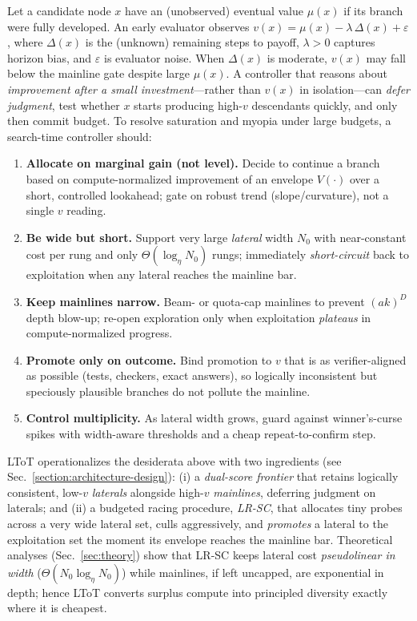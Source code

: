 \documentclass{article}
\begin{document}
Let a candidate node $x$ have an (unobserved) eventual value $\mu(x)$ if its branch were fully developed.
An early evaluator observes $v(x) = \mu(x) - \lambda \,\Delta(x) + \varepsilon$, where $\Delta(x)$ is the (unknown) remaining steps to payoff, $\lambda>0$ captures horizon bias, and $\varepsilon$ is evaluator noise.
When $\Delta(x)$ is moderate, $v(x)$ may fall below the mainline gate despite large $\mu(x)$.
A controller that reasons about \emph{improvement after a small investment}—rather than $v(x)$ in isolation—can \emph{defer judgment}, test whether $x$ starts producing high-$v$ descendants quickly, and only then commit budget.
To resolve saturation and myopia under large budgets, a search-time controller should:
\begin{enumerate}[leftmargin=*, itemsep=2pt, topsep=2pt]
    \item \textbf{Allocate on marginal gain (not level).} Decide to continue a branch based on compute-normalized improvement of an envelope $V(\cdot)$ over a short, controlled lookahead; gate on robust trend (slope/curvature), not a single $v$ reading.
    \item \textbf{Be wide but short.} Support very large \emph{lateral} width $N_0$ with near-constant cost per rung and only $\Theta(\log_{\eta} N_0)$ rungs; immediately \emph{short-circuit} back to exploitation when any lateral reaches the mainline bar.
    \item \textbf{Keep mainlines narrow.} Beam- or quota-cap mainlines to prevent $(ak)^D$ depth blow-up; re-open exploration only when exploitation \emph{plateaus} in compute-normalized progress.
    \item \textbf{Promote only on outcome.} Bind promotion to $v$ that is as verifier-aligned as possible (tests, checkers, exact answers), so logically inconsistent but speciously plausible branches do not pollute the mainline.
    \item \textbf{Control multiplicity.} As lateral width grows, guard against winner's-curse spikes with width-aware thresholds and a cheap repeat-to-confirm step.
\end{enumerate}

LToT operationalizes the desiderata above with two ingredients (see Sec.~\ref{section:architecture-design}):
(i) a \emph{dual-score frontier} that retains logically consistent, low-$v$ \emph{laterals} alongside high-$v$ \emph{mainlines}, deferring judgment on laterals; and
(ii) a budgeted racing procedure, \emph{LR-SC}, that allocates tiny probes across a very wide lateral set, culls aggressively, and \emph{promotes} a lateral to the exploitation set the moment its envelope reaches the mainline bar.
Theoretical analyses (Sec.~\ref{sec:theory}) show that LR-SC keeps lateral cost \emph{pseudolinear in width} ($\Theta(N_0\log_{\eta} N_0)$) while mainlines, if left uncapped, are exponential in depth; hence LToT converts surplus compute into principled diversity exactly where it is cheapest.
\end{document}
